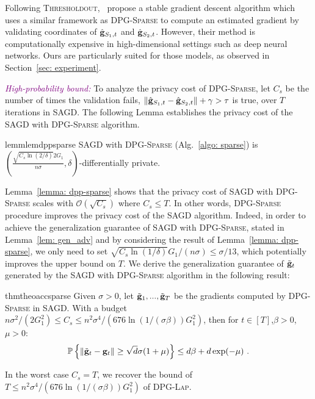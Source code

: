 \documentclass[11pt]{article}
\begin{document}
Following \textsc{Thresholdout},~\citet{zhch2018} propose a stable gradient descent algorithm which uses a similar framework as \textsc{DPG-Sparse} to compute an estimated gradient by validating coordinates of $\hat {\mathbf{g}}_{S_1,t}$ and $\hat {\mathbf{g}}_{S_2,t}$. 
However, their method is computationally expensive in high-dimensional settings such as deep neural networks. Ours are particularly suited for those models, as observed in Section~\ref{sec: experiment}.

\textcolor{purple}{\textit{High-probability bound:}}
To analyze the privacy cost of \textsc{DPG-Sparse}, let $C_{s}$ be the number of times the validation fails, \ie $\| \hat {\mathbf{g}}_{S_1,t} - \hat {\mathbf{g}}_{S_2,t}\| + \gamma >  \tau$ is true, over $T$ iterations in \textsc{SAGD}. The following Lemma establishes the privacy cost of the \textsc{SAGD} with \textsc{DPG-Sparse} algorithm.
\begin{restatable}{lemm}{lemdppsparse}
\label{lemma: dpp-sparse}
\textsc{SAGD} with \textsc{DPG-Sparse}  (Alg.~\ref{algo: sparse}) is  
$(\frac{\sqrt{C_{s} \ln(2/\delta)} 2G_1}{n\sigma}, \delta)$-differentially private. 
\end{restatable}
Lemma~\ref{lemma: dpp-sparse} shows that the privacy cost of  \textsc{SAGD} with \textsc{DPG-Sparse} scales with $\mathcal{O}(\sqrt{C_{s}})$ where $C_{s} \leq T$. 
In other words, \textsc{DPG-Sparse} procedure improves the privacy cost of the \textsc{SAGD} algorithm. 
Indeed, in order to achieve the generalization guarantee of \textsc{SAGD} with \textsc{DPG-Sparse}, stated in Lemma~\ref{lem: gen_adv} and  by considering the result of Lemma~\ref{lemma: dpp-sparse},  we only need to set $\sqrt{C_{s} \ln(1/\delta)} G_1/(n\sigma) \leq \sigma/13$, which potentially improves the upper bound on $T$. 
We derive the generalization guarantee of $\tilde {\mathbf{g}}_t$ generated by the \textsc{SAGD} with \textsc{DPG-Sparse} algorithm in the following result:
\begin{restatable}{thm}{theoaccsparse}
\label{thm: acc_sparse}
Given $\sigma > 0$, let $\tilde {\mathbf{g}}_1,...,  \tilde {\mathbf{g}}_T$ be the gradients computed by \textsc{DPG-Sparse} in \textsc{SAGD}. With a budget $ n\sigma^2/(2G_1^2) \leq C_{s} \leq n^2 \sigma^4/(676 \ln(1/(\sigma \beta))G_1^2)$, then for $t \in [T]$,$\beta > 0$, $\mu > 0$:
        \begin{equation*}
    \mathbb{P}\left\{\|\tilde {\mathbf{g}}_t - \mathbf{g}_t\| \geq \sqrt{d}\sigma(1+\mu)\right\} \leq d\beta + d\exp(-\mu)~.
    \end{equation*}
\end{restatable}
In the worst case $C_{s} = T$, we recover the bound of $T \leq n^2 \sigma^4/(676 \ln(1/(\sigma \beta))G_1^2)$ of \textsc{DPG-Lap}.
\end{document}
